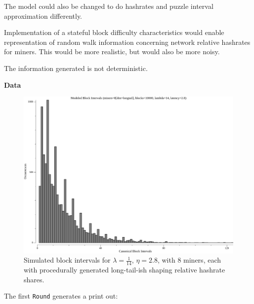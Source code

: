 \documentclass[11pt]{article}
\theoremstyle{plain}
\begin{document}
The model could also be changed to do hashrates and puzzle interval
approximation differently.

Implementation of a stateful block difficulty characteristics would enable
representation of random walk information concerning network relative hashrates
for miners. This would be more realistic, but would also be more noisy.



The information generated is not deterministic.

\textbf{Data}


\begin{figure}[tph]
    \centering
\includegraphics[width=1.0\textwidth]{go-poisson_A0_blockIntervals.png}
    \caption{
      Simulated block intervals for $\lambda=\frac{1}{14}$, $\eta=2.8$, with
      $8$ miners, each with procedurally generated long-tail-ish shaping
      relative hashrate shares.
    }
\end{figure}

\pagebreak

The first \texttt{Round} generates a print out:
\end{document}
